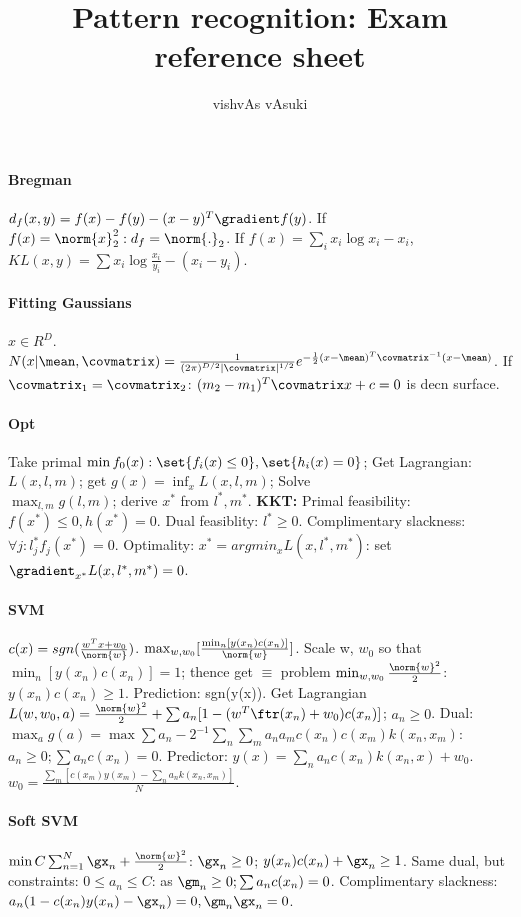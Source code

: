 \documentclass[10pt]{article}
\title{Pattern recognition: Exam reference sheet}
\author{vishvAs vAsuki}
\begin{document}
\paragraph*{Bregman}
$d_f(x, y) = f(x) - f(y) - (x-y)^{T}\gradient f(y)$. If $f(x) = \norm{x}_2^{2}: d_f = \norm{.}_2$. If $f(x) = \sum_{i}x_i \log x_i - x_i$, $KL(x, y) = \sum x_i \log \frac{x_i}{y_i} - (x_i - y_i)$.

\paragraph*{Fitting Gaussians}
$x \in R^{D}$. $N(x|\mean, \covmatrix) = \frac{1}{(2\pi)^{D/2} |\covmatrix|^{1/2}} e^{-\frac{1}{2}(x - \mean)^{T}\covmatrix^{-1}(x-\mean)}$. If $\covmatrix_1 = \covmatrix_2$: $(m_2 - m_1)^{T}\covmatrix x + c = 0$ is decn surface.

\paragraph*{Opt}
Take primal $\min f_{0}(x): \set{f_{i}(x) \leq 0}, \set{h_{i}(x) = 0} $; Get Lagrangian: $L(x, l, m)$; get $g(x) = \inf_x L(x, l, m)$; Solve \\
$\max_{l, m} g(l, m)$; derive $x^{*}$ from $l^{*}, m^{*}$. \textbf{KKT:} Primal feasibility: $f(x^{*}) \leq 0, h(x^{*}) = 0$. Dual feasiblity: $l^{*} \geq 0$. Complimentary slackness: $\forall j: l_{j}^{*}f_{j}(x^{*}) = 0$. Optimality: $x^{*} = argmin_x L(x, l^{*}, m^{*})$: set $\gradient_{x^{*}}L(x, l^{*}, m^{*}) = 0$.

\paragraph*{SVM}
$c(x) = sgn(\frac{w^{T}x + w_0}{\norm{w}})$. $\max_{w,w_0}[\frac{\min_{n}[y(x_{n})c(x_{n})]}{\norm{w}}]$. Scale w, $w_0$ so that $\min_{n}[y(x_{n})c(x_{n})] = 1$; thence get $\equiv$ problem $\min_{w,w_0}\frac{\norm{w}^{2}}{2}$: $y(x_{n})c(x_{n}) \geq 1$. Prediction: sgn(y(x)). Get Lagrangian $L(w, w_0, a) = \frac{\norm{w}^{2}}{2} + \sum a_{n}[1-(w^{T} \ftr(x_n) + w_0)c(x_{n})]$; $a_{n} \geq 0$. Dual: $\max_a g(a) = \max \sum a_{n} - 2^{-1}\sum_{n}\sum_{m} a_{n}a_{m}c(x_{n})c(x_{m})k(x_{n}, x_{m})$: $a_{n} \geq 0; \sum a_{n}c(x_{n}) = 0$. Predictor: $y(x) = \sum_{n}a_{n}c(x_{n})k(x_{n}, x) + w_0$. $w_0 = \frac{\sum_{m} [c(x_{m})y(x_m) - \sum_n a_{n}k(x_{n}, x_{m})]}{N}$.

\paragraph*{Soft SVM}
$\min C\sum_{n=1}^{N} \gx_{n} + \frac{\norm{w}^{2}}{2}$: $\gx_{n} \geq 0$; $y(x_{n})c(x_{n}) + \gx_{n} \geq 1$. Same dual, but constraints: $0 \leq a_{n} \leq C$: as $\gm_{n} \geq 0; \sum a_{n}c(x_{n}) = 0$. Complimentary slackness: $a_{n}(1 - c(x_{n})y(x_{n}) - \gx_{n}) = 0, \gm_{n}\gx_{n} = 0$.
\end{document}
